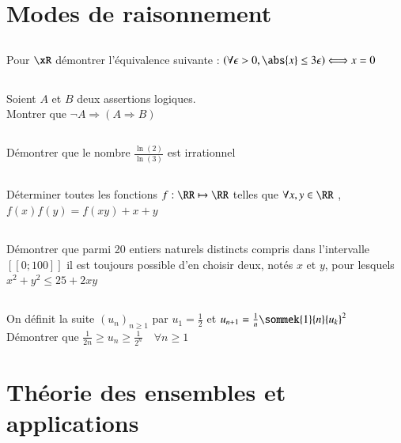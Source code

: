 \documentclass[oneside,12pt]{article}
\begin{document}
\section{Modes de raisonnement}

\subsection{}
Pour $\xR$ démontrer l'équivalence suivante : $\left( \forall \epsilon>0 , \abs{x}\leq3\epsilon \right) \Longleftrightarrow x=0$

\subsection{}
Soient $A$ et $B$ deux assertions logiques.\\
Montrer que $\neg A \Rightarrow ( A \Rightarrow B)$

\subsection{}
Démontrer que le nombre $\frac{\ln(2)}{\ln(3)}$ est irrationnel

\subsection{}
Déterminer toutes les fonctions $f:\RR\mapsto\RR$ telles que $\forall x,y\in\RR$ , $f(x)f(y)=f(xy)+x+y$

\subsection{}
Démontrer que parmi 20 entiers naturels distincts compris dans l'intervalle $[\![0;100]\!]$ il est toujours possible d'en choisir deux, notés $x$ et $y$, pour lesquels $x^2+y^2\leq25+2xy$

\subsection{}
On définit la suite ${(u_n)}_{n\geq1}$ par $u_1=\frac{1}{2}$ et $u_{n+1}=\frac{1}{n} \sommek{1}{n}{u_k}^2$ \\
Démontrer que $\frac{1}{2n} \geq u_n \geq \frac{1}{2^n} \quad\forall n\geq1$



\section{Théorie des ensembles et applications}
\end{document}

